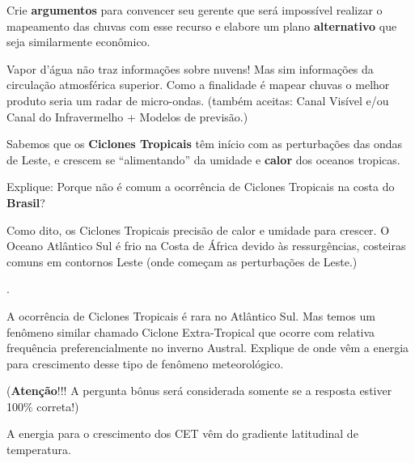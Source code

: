 \documentclass[letterpaper,portuguese,12pt,pdftex]{exam}
\begin{document}
\begin{questions}
    Crie {\bf argumentos} para convencer seu gerente que será impossível
    realizar o mapeamento das chuvas com esse recurso e elabore um plano
    {\bf alternativo} que seja similarmente econômico.

    \begin{solution}
      Vapor d'água não traz informações sobre nuvens!  Mas sim informações
      da circulação atmosférica superior.  Como a finalidade é mapear chuvas o
      melhor produto seria um radar de micro-ondas.  (também aceitas: Canal
      Visível e/ou Canal do Infravermelho + Modelos de previsão.)
    \end{solution}


  \question[5]
    Sabemos que os {\bf Ciclones Tropicais} têm início com as perturbações das
    ondas de Leste, e crescem se ``alimentando'' da umidade e {\bf calor} dos
    oceanos tropicas.

    Explique: Porque não é comum a ocorrência de Ciclones Tropicais na costa do
    {\bf Brasil}?

    \begin{solution}
      Como dito, os Ciclones Tropicais precisão de calor e umidade para crescer.
      O Oceano Atlântico Sul é frio na Costa de África devido às ressurgências,
      costeiras comuns em contornos Leste (onde começam as perturbações de
      Leste.)
    \end{solution}


  .

    A ocorrência de Ciclones Tropicais é rara no Atlântico Sul.  Mas temos um
    fenômeno similar chamado Ciclone Extra-Tropical que ocorre com relativa
    frequência preferencialmente no inverno Austral.  Explique de onde vêm a
    energia para crescimento desse tipo de fenômeno meteorológico.

    ({\bf Atenção}!!! A pergunta bônus será considerada somente se a
    resposta estiver 100\% correta!)

      \begin{solution}
        A energia para o crescimento dos CET vêm do gradiente latitudinal de
        temperatura.
      \end{solution}




\end{questions}
\end{document}

